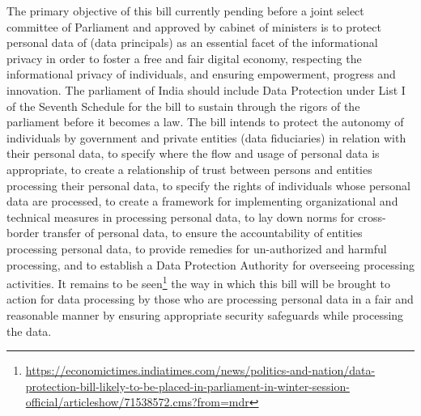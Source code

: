 \begin{multicols}{2}
\begin{itemize}
The primary objective of this bill currently pending before a joint select committee of Parliament and approved by cabinet of ministers is to protect personal data of (data principals) as an essential facet of the informational privacy in order to foster a free and fair digital economy, respecting the informational privacy of individuals, and ensuring empowerment, progress and innovation. The parliament of India should include Data Protection under List I of the Seventh Schedule for the bill to sustain through the rigors of the parliament before it becomes a law. The bill intends to protect the autonomy of individuals by government and private entities (data fiduciaries) in relation with their personal data, to specify where the flow and usage of personal data is appropriate, to create a relationship of trust between persons and entities processing their personal data, to specify the rights of individuals whose personal data are processed, to create a framework for implementing organizational and technical measures in processing personal data, to lay down norms for cross-border transfer of personal data, to ensure the accountability of entities processing personal data, to provide remedies for un-authorized and harmful processing, and to establish a Data Protection Authority for overseeing processing activities. It remains to be seen\footnote{\url{https://economictimes.indiatimes.com/news/politics-and-nation/data-protection-bill-likely-to-be-placed-in-parliament-in-winter-session-official/articleshow/71538572.cms?from=mdr}} the way in which this bill will be brought to action for data processing by those who are processing personal data in a fair and reasonable manner by ensuring appropriate security safeguards while processing the data. 

\vskip 0.15cm


\end{itemize}
\end{multicols}
